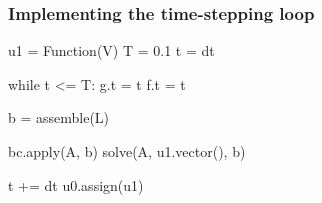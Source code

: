 \begin{frame}[fragile]
  \frametitle{Implementing the time-stepping loop}

\begin{python}
u1 = Function(V)
T = 0.1
t = dt

while t <= T:
    g.t = t
    f.t = t

    b = assemble(L)

    bc.apply(A, b)
    solve(A, u1.vector(), b)

    t += dt
    u0.assign(u1)
\end{python}

\end{frame}
